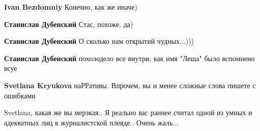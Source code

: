 \begin{itemize}
\begin{itemize}
 

\textbf{Ivan Bezdomniy}
Конечно, как же иначе)

 
\textbf{Станислав Дубенский}
Стас, похоже, да)


\textbf{Станислав Дубенский}
О сколько нам открытий чудных...)))

 
\textbf{Станислав Дубенский} похолодело все внутри, как имя "Леша" было вспомнено всуе\Laughey[1.0][white]

 

\textbf{Svetlana Kryukova} наРРативы. Впрочем, вы и менее сложные слова пишете с ошибками

 
Svetlana, какая же вы мерзкая.. Я реально вас раннее считал одной из умных и адекватных лиц в журналистской плеяде.. Очень жаль...

 

\end{itemize}
\end{itemize}
